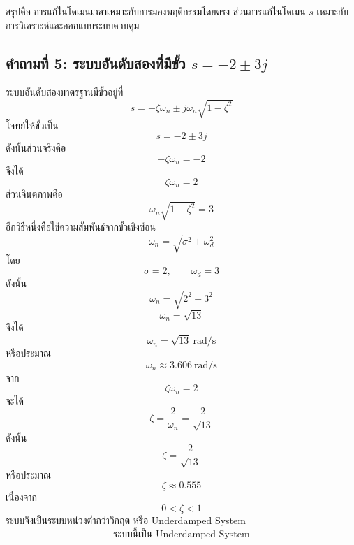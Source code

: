 สรุปคือ การแก้ในโดเมนเวลาเหมาะกับการมองพฤติกรรมโดยตรง ส่วนการแก้ในโดเมน $s$ เหมาะกับการวิเคราะห์และออกแบบระบบควบคุม

\subsection{คำถามที่ 5: ระบบอันดับสองที่มีขั้ว $s=-2\pm3j$}

ระบบอันดับสองมาตรฐานมีขั้วอยู่ที่
\[
s=-\zeta\omega_n\pm j\omega_n\sqrt{1-\zeta^2}
\]
โจทย์ให้ขั้วเป็น
\[
s=-2\pm 3j
\]
ดังนั้นส่วนจริงคือ
\[
-\zeta\omega_n=-2
\]
จึงได้
\[
\zeta\omega_n=2
\]
ส่วนจินตภาพคือ
\[
\omega_n\sqrt{1-\zeta^2}=3
\]
อีกวิธีหนึ่งคือใช้ความสัมพันธ์จากขั้วเชิงซ้อน
\[
\omega_n=\sqrt{\sigma^2+\omega_d^2}
\]
โดย
\[
\sigma=2,\qquad \omega_d=3
\]
ดังนั้น
\[
\omega_n=\sqrt{2^2+3^2}
\]
\[
\omega_n=\sqrt{13}
\]
จึงได้
\[
\boxed{\omega_n=\sqrt{13}\ \mathrm{rad/s}}
\]
หรือประมาณ
\[
\omega_n\approx 3.606\ \mathrm{rad/s}
\]
จาก
\[
\zeta\omega_n=2
\]
จะได้
\[
\zeta=\frac{2}{\omega_n}=\frac{2}{\sqrt{13}}
\]
ดังนั้น
\[
\boxed{\zeta=\frac{2}{\sqrt{13}}}
\]
หรือประมาณ
\[
\zeta\approx 0.555
\]
เนื่องจาก
\[
0<\zeta<1
\]
ระบบจึงเป็นระบบหน่วงต่ำกว่าวิกฤต หรือ Underdamped System
\[
\boxed{\text{ระบบนี้เป็น Underdamped System}}
\]
